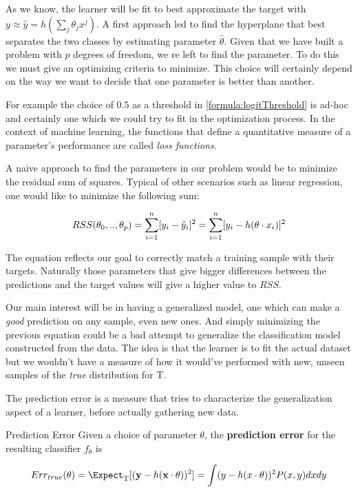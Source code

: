 As we know, the learner will be fit to best approximate the target with $y \approx \hat{y} = h\left(\sum_{j}\theta_j x^j\right)$. A first approach led to find the hyperplane that best separates the two classes by estimating parameter $\hat{\theta}$. Given that we have built a problem with $p$ degrees of freedom, we re left to find the parameter. To do this we must give an optimizing criteria to minimize. This choice will certainly depend on the way we want to decide that one parameter is better than another. 

For example the choice of $0.5$ as a threshold in \ref{formula:logitThreshold} is ad-hoc and certainly one which we could try to fit in the optimization process. In the context of machine learning, the functions that define a quantitative measure of a parameter's performance are called \textit{loss functions}.

A naive approach to find the parameters in our problem would be to minimize the residual sum of squares. Typical of other scenarios such as linear regression, one would like to minimize the following sum:  


\begin{equation} \label{eq:rss}
RSS(\theta_0,..,\theta_p)  = \sum_{i=1}^n [y_i - \hat{y}_i]^2  \\
=  \sum_{i=1}^n [y_i - h( \theta \cdot x_i)]^2
\end{equation}

The equation reflects our goal to correctly match a training sample with their targets. Naturally those parameters that give bigger differences between the predictions and the target values will give a higher value to $RSS$.

Our main interest will be in having a generalized model, one which can make a \textit{good} prediction on any sample, even new ones. And simply minimizing the previous equation could be a bad attempt to generalize the classification model constructed from the data. The idea is that the learner is to fit the actual dataset but we wouldn't have a measure of how it would've performed with new, unseen samples of the \textit{true} distribution for $\mathrm{T}$. 

The prediction error is a measure that tries to characterize the generalization aspect of a learner, before actually gathering new data.

\begin{definition}{Prediction Error}
	Given a choice of parameter $\theta$, the \textbf{prediction error} for the resulting classifier $f_\theta$ is
	
	\[
	Err_{true}(\theta)  = \Expect_{ \mathrm{T}}[(\textbf{y} - h(\textbf{x} \cdot \theta) )^2] \\
	= \int (y - h(x \cdot \theta) )^2 P(x,y)dxdy
	\]
\end{definition}

